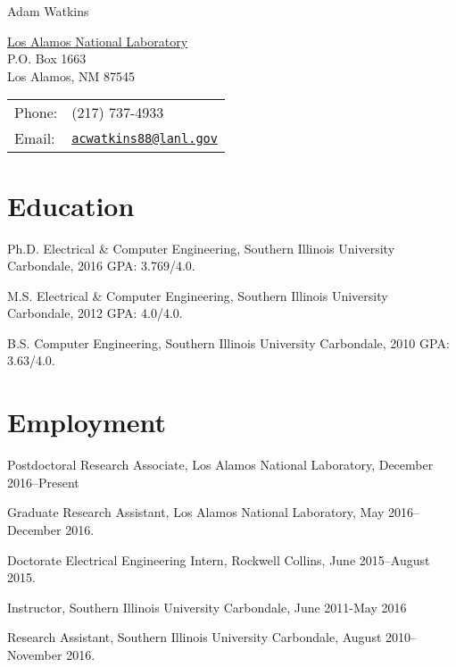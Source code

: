 \documentclass[letterpaper]{article}
\def\name{Adam Watkins}
\renewenvironment{itemize}{
  \begin{list}{}{
    \setlength{\leftmargin}{1.5em}
  }
}{
  \end{list}
}
\begin{document}
{\huge \name}


\vspace{0.25in}

\begin{minipage}{0.45\linewidth}
  \href{}{Los Alamos National Laboratory} \\
  P.O. Box 1663  \\
  Los Alamos, NM 87545
\end{minipage}
\begin{minipage}{0.45\linewidth}
  \begin{tabular}{ll}
    Phone: & (217) 737-4933 \\
    Email: & \href{acwatkins88@lanl.gov}{\tt acwatkins88@lanl.gov} \\
  \end{tabular}
\end{minipage}


\section*{Education}

\begin{itemize}
	
\item Ph.D. Electrical \& Computer Engineering, Southern Illinois University Carbondale, 2016 GPA: 3.769/4.0.
 
\item M.S. Electrical \& Computer Engineering, Southern Illinois University Carbondale, 2012 GPA: 4.0/4.0.

\item B.S. Computer Engineering, Southern Illinois University Carbondale, 2010 GPA: 3.63/4.0.

\end{itemize}


\section*{Employment}

\begin{itemize}
\item Postdoctoral Research Associate, Los Alamos National Laboratory, December 2016--Present
\item Graduate Research Assistant, Los Alamos National Laboratory, May 2016--December 2016.
\item Doctorate Electrical Engineering Intern, Rockwell Collins, June 2015--August 2015.
\item Instructor, Southern Illinois University Carbondale, June 2011-May 2016
\item Research Assistant, Southern Illinois University Carbondale, August 2010--November 2016.
\end{itemize}
\end{document}
